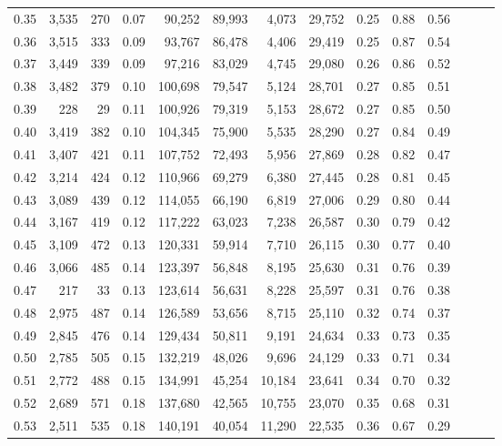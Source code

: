 \begin{tabular}{rrrrrrrrrrrrrr}
0.35 &  3,535 &    270 &  0.07 &   90,252 &   89,993 &   4,073 &  29,752 &  0.25 &  0.88 &      0.56 \\
0.36 &  3,515 &    333 &  0.09 &   93,767 &   86,478 &   4,406 &  29,419 &  0.25 &  0.87 &      0.54 \\
0.37 &  3,449 &    339 &  0.09 &   97,216 &   83,029 &   4,745 &  29,080 &  0.26 &  0.86 &      0.52 \\
0.38 &  3,482 &    379 &  0.10 &  100,698 &   79,547 &   5,124 &  28,701 &  0.27 &  0.85 &      0.51 \\
0.39 &    228 &     29 &  0.11 &  100,926 &   79,319 &   5,153 &  28,672 &  0.27 &  0.85 &      0.50 \\
0.40 &  3,419 &    382 &  0.10 &  104,345 &   75,900 &   5,535 &  28,290 &  0.27 &  0.84 &      0.49 \\
0.41 &  3,407 &    421 &  0.11 &  107,752 &   72,493 &   5,956 &  27,869 &  0.28 &  0.82 &      0.47 \\
0.42 &  3,214 &    424 &  0.12 &  110,966 &   69,279 &   6,380 &  27,445 &  0.28 &  0.81 &      0.45 \\
0.43 &  3,089 &    439 &  0.12 &  114,055 &   66,190 &   6,819 &  27,006 &  0.29 &  0.80 &      0.44 \\
0.44 &  3,167 &    419 &  0.12 &  117,222 &   63,023 &   7,238 &  26,587 &  0.30 &  0.79 &      0.42 \\
0.45 &  3,109 &    472 &  0.13 &  120,331 &   59,914 &   7,710 &  26,115 &  0.30 &  0.77 &      0.40 \\
0.46 &  3,066 &    485 &  0.14 &  123,397 &   56,848 &   8,195 &  25,630 &  0.31 &  0.76 &      0.39 \\
0.47 &    217 &     33 &  0.13 &  123,614 &   56,631 &   8,228 &  25,597 &  0.31 &  0.76 &      0.38 \\
0.48 &  2,975 &    487 &  0.14 &  126,589 &   53,656 &   8,715 &  25,110 &  0.32 &  0.74 &      0.37 \\
0.49 &  2,845 &    476 &  0.14 &  129,434 &   50,811 &   9,191 &  24,634 &  0.33 &  0.73 &      0.35 \\
0.50 &  2,785 &    505 &  0.15 &  132,219 &   48,026 &   9,696 &  24,129 &  0.33 &  0.71 &      0.34 \\
0.51 &  2,772 &    488 &  0.15 &  134,991 &   45,254 &  10,184 &  23,641 &  0.34 &  0.70 &      0.32 \\
0.52 &  2,689 &    571 &  0.18 &  137,680 &   42,565 &  10,755 &  23,070 &  0.35 &  0.68 &      0.31 \\
0.53 &  2,511 &    535 &  0.18 &  140,191 &   40,054 &  11,290 &  22,535 &  0.36 &  0.67 &      0.29 \\

\end{tabular}
